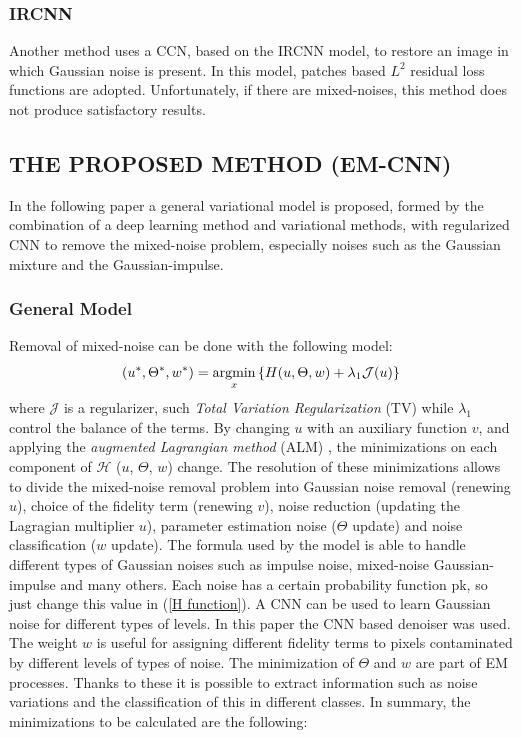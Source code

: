 \subsubsection{IRCNN}
Another method \cite{0884882819} uses a CCN, based on the IRCNN model, to restore an 
image in which Gaussian noise is present. In this model, patches based $ L^2 $ 
residual loss functions are adopted. Unfortunately, if there are mixed-noises, 
this method does not produce satisfactory results.

\subsection{THE PROPOSED METHOD (EM-CNN)}
In the following paper a general variational model is proposed, formed by 
the combination of a deep learning method and variational methods, with 
regularized CNN to remove the mixed-noise problem, especially noises such 
as the Gaussian mixture and the Gaussian-impulse.

\subsubsection{General Model}
Removal of mixed-noise can be done with the following model:
\begin{equation}\label{HFunction}
    (u^*, \Theta^*, w^*) = \operatorname*{argmin}_x\left\{H(u,\Theta,w) + \lambda_1\mathcal{J}(u)\right\}
\end{equation}
where $\mathcal{J}$ is a regularizer, such \emph{Total Variation Regularization} (TV) while $ \lambda_1 $ 
control the balance of the terms. By changing $u$ with an auxiliary function 
$v$, and applying the \emph{augmented Lagrangian method} (ALM) \cite{0884882833}, the minimizations 
on each component of $\mathcal{H}$ ($u$, $\Theta$, $w$) change. The resolution of these 
minimizations allows to divide the mixed-noise removal problem into Gaussian 
noise removal (renewing $u$), choice of the fidelity term (renewing $v$), 
noise reduction (updating the Lagragian multiplier $u$), parameter estimation 
noise ($\Theta$ update) and noise classification ($w$ update). The formula used by 
the model is able to handle different types of Gaussian noises such as impulse 
noise, mixed-noise Gaussian-impulse and many others. Each noise has 
a certain probability function pk, so just change this value in (\ref{H function}). A CNN 
can be used to learn Gaussian noise for different types of levels. In this paper 
the CNN based denoiser \cite{0884882819} was used. The weight $w$ is useful for assigning 
different fidelity terms to pixels contaminated by different levels of types of 
noise. The minimization of $\Theta$ and $w$ are part of EM processes. Thanks to 
these it is possible to extract information such as noise variations and the 
classification of this in different classes. In summary, the minimizations to 
be calculated are the following:

